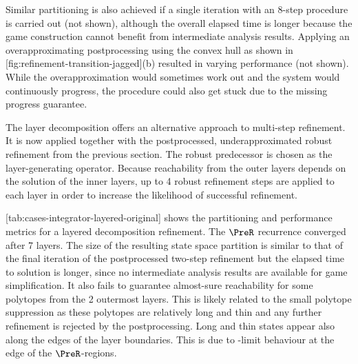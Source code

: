     Similar partitioning is also achieved if a single iteration with an 8-step procedure is carried out (not shown), although the overall elapsed time is longer because the game construction cannot benefit from intermediate analysis results.
    Applying an overapproximating postprocessing using the convex hull as shown in [fig:refinement-transition-jagged](b) resulted in varying performance (not shown).
    While the overapproximation would sometimes work out and the system would continuously progress, the procedure could also get stuck due to the missing progress guarantee.

\stopsubsection


\startsubsection[title={Positive Robust Refinement with Layer Decomposition},reference=sec:cases-integrator-layered]


    The layer decomposition offers an alternative approach to multi-step refinement.
    It is now applied together with the postprocessed, underapproximated robust refinement from the previous section.
    The robust predecessor is chosen as the layer-generating operator.
    Because reachability from the outer layers depends on the solution of the inner layers, up to 4 robust refinement steps are applied to each layer in order to increase the likelihood of successful refinement.

    [tab:cases-integrator-layered-original] shows the partitioning and performance metrics for a layered decomposition refinement.
    The $\PreR$ recurrence converged after 7 layers.
    The size of the resulting state space partition is similar to that of the final iteration of the postprocessed two-step refinement but the elapsed time to solution is longer, since no intermediate analysis results are available for game simplification.
    It also fails to guarantee almost-sure reachability for some polytopes from the 2 outermost layers.
    This is likely related to the small polytope suppression as these polytopes are relatively long and thin and any further refinement is rejected by the postprocessing.
    Long and thin states appear also along the edges of the layer boundaries.
    This is due to \epsilon-limit behaviour at the edge of the $\PreR$-regions.

